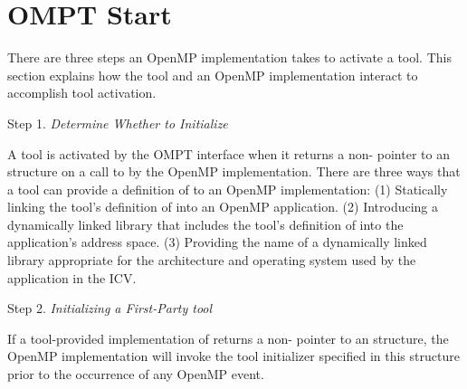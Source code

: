 \pagebreak
\section{OMPT Start}
\label{sec:ompt_start}

There are three steps an OpenMP implementation takes to activate a tool.
This section explains how the tool and an OpenMP implementation interact to accomplish tool activation.

Step 1. \emph{Determine Whether to Initialize}
\begin{adjustwidth}{2.5em}{0pt}
A tool is activated by the OMPT interface when it returns a non- pointer to an  structure on a call to  by the OpenMP implementation.
There are three ways that a tool can provide a definition of  to an OpenMP implementation:
(1) Statically linking the tool's definition of  into an OpenMP application.
(2) Introducing a dynamically linked library that includes the tool's definition of
 into the application's address space.
(3) Providing the name of a dynamically linked library appropriate for the architecture
and operating system used by the application in the  ICV.
\end{adjustwidth}

Step 2. \emph{Initializing a First-Party tool}
\begin{adjustwidth}{2.5em}{0pt}
If a tool-provided implementation of  returns a non- pointer
to an  structure, the OpenMP implementation will invoke
the tool initializer specified in this structure prior to the occurrence of any OpenMP event.
\end{adjustwidth}


